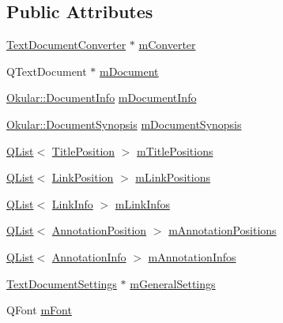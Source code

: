 \subsection*{Public Attributes}
\begin{DoxyCompactItemize}
\item 
\hyperlink{classOkular_1_1TextDocumentConverter}{Text\+Document\+Converter} $\ast$ \hyperlink{classOkular_1_1TextDocumentGeneratorPrivate_afe4df409b1e2fba52c7a027454d4eeef}{m\+Converter}
\item 
Q\+Text\+Document $\ast$ \hyperlink{classOkular_1_1TextDocumentGeneratorPrivate_abee33b8837b86732e286172de83e110e}{m\+Document}
\item 
\hyperlink{classOkular_1_1DocumentInfo}{Okular\+::\+Document\+Info} \hyperlink{classOkular_1_1TextDocumentGeneratorPrivate_a01e0da5b05611ea533eb92702943c8be}{m\+Document\+Info}
\item 
\hyperlink{classOkular_1_1DocumentSynopsis}{Okular\+::\+Document\+Synopsis} \hyperlink{classOkular_1_1TextDocumentGeneratorPrivate_aca9fca1479a2577d263d40e93c4960fd}{m\+Document\+Synopsis}
\item 
\hyperlink{classQList}{Q\+List}$<$ \hyperlink{structOkular_1_1TextDocumentGeneratorPrivate_1_1TitlePosition}{Title\+Position} $>$ \hyperlink{classOkular_1_1TextDocumentGeneratorPrivate_a2facb58407e1b46e1e534956d1b1d46d}{m\+Title\+Positions}
\item 
\hyperlink{classQList}{Q\+List}$<$ \hyperlink{structOkular_1_1TextDocumentGeneratorPrivate_1_1LinkPosition}{Link\+Position} $>$ \hyperlink{classOkular_1_1TextDocumentGeneratorPrivate_a84d3854584bfdb3c5151bb6bb049cbba}{m\+Link\+Positions}
\item 
\hyperlink{classQList}{Q\+List}$<$ \hyperlink{structOkular_1_1TextDocumentGeneratorPrivate_1_1LinkInfo}{Link\+Info} $>$ \hyperlink{classOkular_1_1TextDocumentGeneratorPrivate_a5378139e49bb973e98ac5a448401ff9e}{m\+Link\+Infos}
\item 
\hyperlink{classQList}{Q\+List}$<$ \hyperlink{structOkular_1_1TextDocumentGeneratorPrivate_1_1AnnotationPosition}{Annotation\+Position} $>$ \hyperlink{classOkular_1_1TextDocumentGeneratorPrivate_a901bfd4fee249261a7816ccf96609801}{m\+Annotation\+Positions}
\item 
\hyperlink{classQList}{Q\+List}$<$ \hyperlink{structOkular_1_1TextDocumentGeneratorPrivate_1_1AnnotationInfo}{Annotation\+Info} $>$ \hyperlink{classOkular_1_1TextDocumentGeneratorPrivate_ae2e334678a1fa943878aec4c55b30cf7}{m\+Annotation\+Infos}
\item 
\hyperlink{classOkular_1_1TextDocumentSettings}{Text\+Document\+Settings} $\ast$ \hyperlink{classOkular_1_1TextDocumentGeneratorPrivate_a971d6bd6506cee93e6a8f0350feed03c}{m\+General\+Settings}
\item 
Q\+Font \hyperlink{classOkular_1_1TextDocumentGeneratorPrivate_a33bafae112835888fdcce49189d66b52}{m\+Font}
\end{DoxyCompactItemize}
